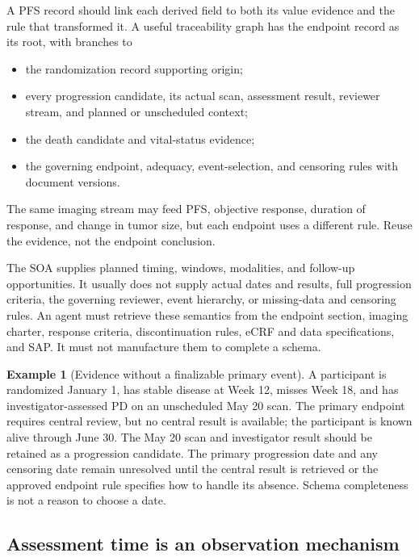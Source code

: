 \documentclass[12pt,oneside]{book}
\numberwithin{equation}{section}
\theoremstyle{definition}
\newtheorem{example}{Example}[section]
\theoremstyle{plain}
\theoremstyle{remark}
\begin{document}
A PFS record should link each derived field to both its value evidence and the
rule that transformed it.  A useful traceability graph has the endpoint record
as its root, with branches to
\begin{itemize}
    \item the randomization record supporting origin;
    \item every progression candidate, its actual scan, assessment result,
    reviewer stream, and planned or unscheduled context;
    \item the death candidate and vital-status evidence;
    \item the governing endpoint, adequacy, event-selection, and censoring
    rules with document versions.
\end{itemize}
The same imaging stream may feed PFS, objective response, duration of response,
and change in tumor size, but each endpoint uses a different rule.  Reuse the
evidence, not the endpoint conclusion.

The SOA supplies planned timing, windows, modalities, and follow-up
opportunities.  It usually does not supply actual dates and results, full
progression criteria, the governing reviewer, event hierarchy, or missing-data
and censoring rules.  An agent must retrieve these semantics from the endpoint
section, imaging charter, response criteria, discontinuation rules, eCRF and
data specifications, and SAP.  It must not manufacture them to complete a
schema.

\begin{example}[Evidence without a finalizable primary event]
A participant is randomized January 1, has stable disease at Week 12, misses
Week 18, and has investigator-assessed PD on an unscheduled May 20 scan.  The
primary endpoint requires central review, but no central result is available;
the participant is known alive through June 30.  The May 20 scan and
investigator result should be retained as a progression candidate.  The primary
progression date and any censoring date remain unresolved until the central
result is retrieved or the approved endpoint rule specifies how to handle its
absence.  Schema completeness is not a reason to choose a date.
\end{example}

\subsection{Assessment time is an observation mechanism}
\end{document}
